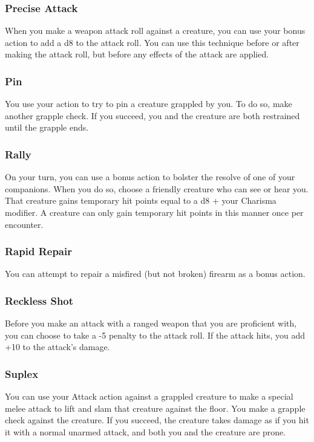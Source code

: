 \subsubsection{Precise Attack} \label{tec::preciseattack}
When you make a weapon attack roll against a creature, you can use your bonus action to add a d8 to the attack roll.
You can use this technique before or after making the attack roll, but before any effects of the attack are applied.

\subsubsection{Pin} \label{tec::pin}
You use your action to try to pin a creature grappled by you.
To do so, make another grapple check.
If you succeed, you and the creature are both restrained until the grapple ends.

\subsubsection{Rally} \label{tec::rally}
On your turn, you can use a bonus action to bolster the resolve of one of your companions.
When you do so, choose a friendly creature who can see or hear you.
That creature gains temporary hit points equal to a d8 + your Charisma modifier.
A creature can only gain temporary hit points in this manner once per encounter.

\subsubsection{Rapid Repair} \label{tec::rapidrepair}
You can attempt to repair a misfired (but not broken) firearm as a bonus action.

\subsubsection{Reckless Shot} \label{tec::recklessshot}
Before you make an attack with a ranged weapon that you are proficient with, you can choose to take a -5 penalty to the attack roll.
If the attack hits, you add +10 to the attack's damage.

\subsubsection{Suplex} \label{tec::suplex}
You can use your Attack action against a grappled creature to make a special melee attack to lift and slam that creature against the floor.
You make a grapple check against the creature.
If you succeed, the creature takes damage as if you hit it with a normal unarmed attack, and both you and the creature are prone.

